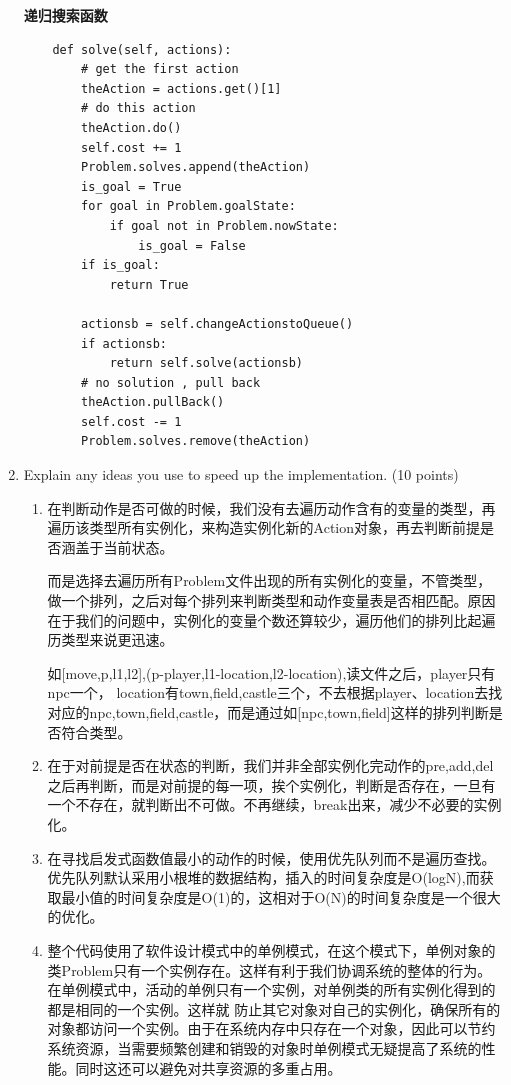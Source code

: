 \documentclass[a4paper, 11pt]{article}
\begin{document}
\begin{enumerate}
	\textbf{递归搜索函数}
	\begin{lstlisting}
    def solve(self, actions):
        # get the first action
        theAction = actions.get()[1]
        # do this action
        theAction.do()
        self.cost += 1
        Problem.solves.append(theAction)
        is_goal = True
        for goal in Problem.goalState:
            if goal not in Problem.nowState:
                is_goal = False
        if is_goal:
            return True

        actionsb = self.changeActionstoQueue()
        if actionsb:
            return self.solve(actionsb)
        # no solution , pull back
        theAction.pullBack()
        self.cost -= 1
        Problem.solves.remove(theAction)	
	\end{lstlisting}

\item Explain any ideas you use to speed up the implementation. (10 points)
\begin{enumerate}
\item 在判断动作是否可做的时候，我们没有去遍历动作含有的变量的类型，再遍历该类型所有实例化，来构造实例化新的Action对象，再去判断前提是否涵盖于当前状态。
	
	而是选择去遍历所有Problem文件出现的所有实例化的变量，不管类型，做一个排列，之后对每个排列来判断类型和动作变量表是否相匹配。原因在于我们的问题中，实例化的变量个数还算较少，遍历他们的排列比起遍历类型来说更迅速。
	
	如[move,p,l1,l2],(p-player,l1-location,l2-location),读文件之后，player只有npc一个，
	location有town,field,castle三个，不去根据player、location去找对应的npc,town,field,castle，而是通过如[npc,town,field]这样的排列判断是否符合类型。
\item 在于对前提是否在状态的判断，我们并非全部实例化完动作的pre,add,del之后再判断，而是对前提的每一项，挨个实例化，判断是否存在，一旦有一个不存在，就判断出不可做。不再继续，break出来，减少不必要的实例化。
\item 在寻找启发式函数值最小的动作的时候，使用优先队列而不是遍历查找。优先队列默认采用小根堆的数据结构，插入的时间复杂度是O(logN),而获取最小值的时间复杂度是O(1)的，这相对于O(N)的时间复杂度是一个很大的优化。
\item 整个代码使用了软件设计模式中的单例模式，在这个模式下，单例对象的类Problem只有一个实例存在。这样有利于我们协调系统的整体的行为。在单例模式中，活动的单例只有一个实例，对单例类的所有实例化得到的都是相同的一个实例。这样就 防止其它对象对自己的实例化，确保所有的对象都访问一个实例。由于在系统内存中只存在一个对象，因此可以节约系统资源，当需要频繁创建和销毁的对象时单例模式无疑提高了系统的性能。同时这还可以避免对共享资源的多重占用。
\end{enumerate}


\end{enumerate}
\end{document}
